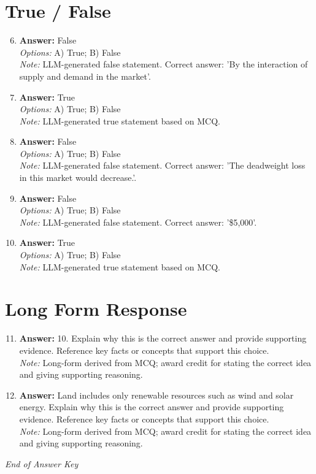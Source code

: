 \documentclass[12pt]{article}
\begin{document}
\section*{True / False}
\begin{enumerate}[label=\arabic*.]
\setcounter{enumi}{5}
\item \textbf{Answer:} False
\\ \textit{Options:} A) True; B) False
\\ \textit{Note:} LLM-generated false statement. Correct answer: 'By the interaction of supply and demand in the market'.
\item \textbf{Answer:} True
\\ \textit{Options:} A) True; B) False
\\ \textit{Note:} LLM-generated true statement based on MCQ.
\item \textbf{Answer:} False
\\ \textit{Options:} A) True; B) False
\\ \textit{Note:} LLM-generated false statement. Correct answer: 'The deadweight loss in this market would decrease.'.
\item \textbf{Answer:} False
\\ \textit{Options:} A) True; B) False
\\ \textit{Note:} LLM-generated false statement. Correct answer: '\$5,000'.
\item \textbf{Answer:} True
\\ \textit{Options:} A) True; B) False
\\ \textit{Note:} LLM-generated true statement based on MCQ.
\end{enumerate}

\section*{Long Form Response}
\begin{enumerate}[label=\arabic*.]
\setcounter{enumi}{10}
\item \textbf{Answer:} 10. Explain why this is the correct answer and provide supporting evidence. Reference key facts or concepts that support this choice.
\\ \textit{Note:} Long-form derived from MCQ; award credit for stating the correct idea and giving supporting reasoning.
\item \textbf{Answer:} Land includes only renewable resources such as wind and solar energy. Explain why this is the correct answer and provide supporting evidence. Reference key facts or concepts that support this choice.
\\ \textit{Note:} Long-form derived from MCQ; award credit for stating the correct idea and giving supporting reasoning.
\end{enumerate}

\vfill
\noindent\textit{End of Answer Key}
\end{document}
